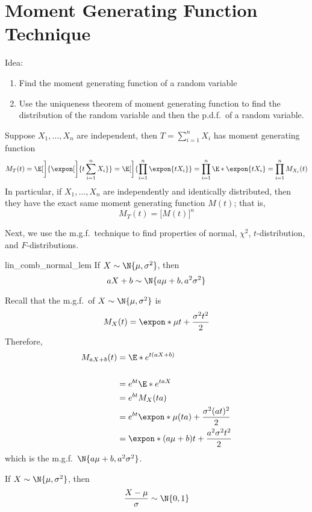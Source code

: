 \section{Moment Generating Function Technique}
Idea:
\begin{enumerate}[label=(\arabic*)]
    \item Find the moment generating function of a random variable
    \item Use the uniqueness theorem of moment generating function
          to find the distribution of the random variable and then
          the p.d.f.\ of a random variable.
\end{enumerate}
\begin{Theorem}{}{}
    Suppose $ X_1,\ldots,X_n $
    are independent, then $ T=\sum_{i=1}^{n} X_i $
    has moment generating function
    \[ M_T(t)=\E[\bigg]{\expon[\bigg]{t \sum_{i=1}^{n} X_i}}=
        \E[\bigg]{\prod_{i=1}^n \expon{tX_i}}=\prod_{i=1}^n \E*{\expon{tX_i}}=
        \prod_{i=1}^n M_{X_i}(t) \]
    In particular, if $ X_1,\ldots,X_n $ are independently
    and identically distributed, then they
    have the exact same moment generating function $ M(t) $;
    that is,
    \[ M_T(t)=\bigl[ M(t) \bigr]^n \]
\end{Theorem}
Next, we use the m.g.f.\ technique to find properties
of normal, $ \chi^2 $, $ t $-distribution,
and $ F $-distributions.

\begin{Lemma}{}{lin_comb_normal_lem}
    If $ X \sim \N{\mu,\sigma^2} $, then
    \[ aX+b \sim \N{a\mu+b,a^2\sigma^2} \]
\end{Lemma}
\begin{Proof}{}{}
    Recall that the m.g.f.\ of $ X \sim \N{\mu,\sigma^2} $ is
    \[ M_X(t)
        =\expon*{\mu t+\frac{\sigma^2t^2}{2}} \]
    Therefore,
    \begin{align*}
        M_{aX+b}(t)
         & =\E*{e^{t(aX+b)}}                                 \\                                                            \\
         & =e^{b t}\E*{e^{taX}}                              \\
         & =e^{b t}M_X(ta)                                   \\
         & =e^{b t}\expon*{\mu(ta)+\frac{\sigma^2(at)^2}{2}} \\
         & =\expon*{(a\mu+b)t+\frac{a^2\sigma^2t^2}{2}}
    \end{align*}
    which is the m.g.f.\ $ \N{a\mu+b,a^2\sigma^2} $.
\end{Proof}
\begin{Theorem}{}{}
    If $ X \sim \N{\mu,\sigma^2} $, then
    \[ \frac{X-\mu}{\sigma} \sim \N{0,1} \]
\end{Theorem}

